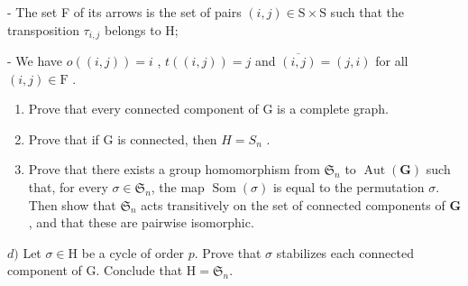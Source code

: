 - The set F of its arrows is the set of pairs \((i,j)\in\mathrm{S}\times\mathrm{S}\) such that the transposition \(\tau_{i,j}\) belongs to H;

- We have \(o((i,j)) = i\) , \(t((i,j)) = j\) and \(\overline{(i,j)} = (j,i)\) for all \((i,j) \in \mathrm{F}\) .

\begin{enumerate}
\def\labelenumi{\alph{enumi})}
\item
  Prove that every connected component of G is a complete graph.
\item
  Prove that if G is connected, then \(H = S_{n}\) .
\item
  Prove that there exists a group homomorphism from \(\mathfrak{S}_n\) to \(\operatorname{Aut}(\mathbf{G})\) such that, for every \(\sigma \in \mathfrak{S}_n\), the map \(\operatorname{Som}(\sigma)\) is equal to the permutation \(\sigma\). Then show that \(\mathfrak{S}_n\) acts transitively on the set of connected components of \(\mathbf{G}\), and that these are pairwise isomorphic.
\end{enumerate}

\(d)\) Let \(\sigma\in\mathrm{H}\) be a cycle of order \(p\). Prove that \(\sigma\) stabilizes each connected component of G. Conclude that \(\mathrm{H}=\mathfrak{S}_{n}\).

